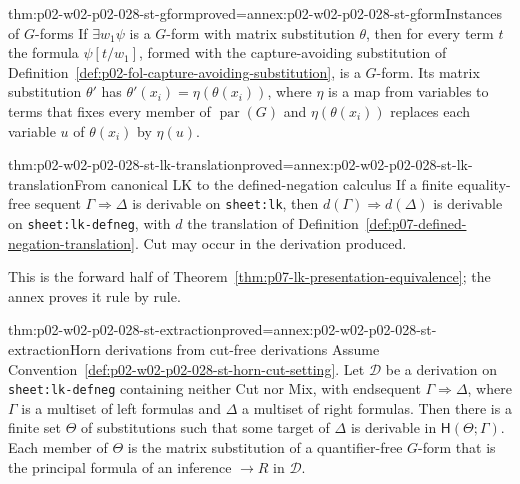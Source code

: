 \begin{hblemma}{thm:p02-w02-p02-028-st-gform}{proved=annex:p02-w02-p02-028-st-gform}{Instances of \(G\)-forms}
If \(\exists w_1\psi\) is a \(G\)-form with matrix substitution \(\theta\),
then for every term \(t\) the formula \(\psi[t/w_1]\), formed with the
capture-avoiding substitution of
Definition~\ref{def:p02-fol-capture-avoiding-substitution}, is a \(G\)-form.
Its matrix substitution \(\theta'\) has
\(\theta'(x_i)=\eta(\theta(x_i))\), where \(\eta\) is a map from variables
to terms that fixes every member of \(\operatorname{par}(G)\) and
\(\eta(\theta(x_i))\) replaces each variable \(u\) of \(\theta(x_i)\) by
\(\eta(u)\).
\end{hblemma}

\begin{hblemma}{thm:p02-w02-p02-028-st-lk-translation}{proved=annex:p02-w02-p02-028-st-lk-translation}{From canonical LK to the defined-negation calculus}
If a finite equality-free sequent \(\Gamma\Rightarrow\Delta\) is derivable
on \texttt{sheet:lk}, then
\(d(\Gamma)\Rightarrow d(\Delta)\) is derivable on
\texttt{sheet:lk-defneg}, with \(d\) the
translation of Definition~\ref{def:p07-defined-negation-translation}.
Cut may occur in the derivation produced.
\end{hblemma}

This is the forward half of
Theorem~\ref{thm:p07-lk-presentation-equivalence}; the annex proves it rule
by rule.

\begin{hblemma}{thm:p02-w02-p02-028-st-extraction}{proved=annex:p02-w02-p02-028-st-extraction}{Horn derivations from cut-free derivations}
Assume Convention~\ref{def:p02-w02-p02-028-st-horn-cut-setting}.  Let
\(\mathcal D\) be a derivation on
\texttt{sheet:lk-defneg} containing neither Cut
nor Mix, with endsequent \(\Gamma\Rightarrow\Delta\), where \(\Gamma\) is a
multiset of left formulas and \(\Delta\) a multiset of right formulas.
Then there is a finite set \(\Theta\) of substitutions such that some target
of \(\Delta\) is derivable in \(\mathsf H(\Theta;\Gamma)\).  Each member of
\(\Theta\) is the matrix substitution of a quantifier-free \(G\)-form that is
the principal formula of an inference \(\to R\) in \(\mathcal D\).
\end{hblemma}

